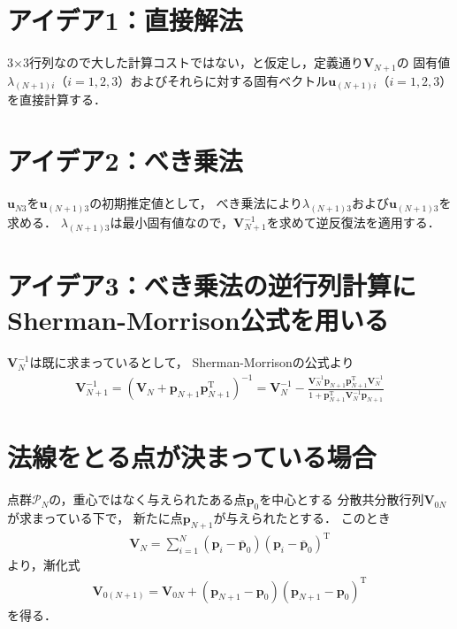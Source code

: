 ﻿\documentclass[a4paper]{jsarticle}
\begin{document}
\section{アイデア1：直接解法}

3×3行列なので大した計算コストではない，と仮定し，定義通り$\bm{V}_{N+1}$の
固有値$\lambda_{(N+1)i}$（$i=1,2,3$）およびそれらに対する固有ベクトル$\bm{u}_{(N+1)i}$（$i=1,2,3$）を直接計算する．


\section{アイデア2：べき乗法}

$\bm{u}_{N3}$を$\bm{u}_{(N+1)3}$の初期推定値として，
べき乗法により$\lambda_{(N+1)3}$および$\bm{u}_{(N+1)3}$を求める．
$\lambda_{(N+1)3}$は最小固有値なので，$\bm{V}_{N+1}^{-1}$を求めて逆反復法を適用する．

\section{アイデア3：べき乗法の逆行列計算にSherman-Morrison公式を用いる}

$\bm{V}_{N}^{-1}$は既に求まっているとして，
Sherman-Morrisonの公式より
\begin{align*}
\bm{V}_{N+1}^{-1}
=(\bm{V}_{N}+\bm{p}_{N+1}\bm{p}_{N+1}^{\mathrm{T}})^{-1}
=\bm{V}_{N}^{-1}-\frac{\bm{V}_{N}^{-1}\bm{p}_{N+1}\bm{p}_{N+1}^{\mathrm{T}}\bm{V}_{N}^{-1}}{1+\bm{p}_{N+1}^{\mathrm{T}}\bm{V}_{N}^{-1}\bm{p}_{N+1}}
\end{align*}



\section{法線をとる点が決まっている場合}

点群$\mathcal{P}_{N}$の，重心ではなく与えられたある点$\bm{p}_{0}$を中心とする
分散共分散行列$\bm{V}_{0N}$が求まっている下で，
新たに点$\bm{p}_{N+1}$が与えられたとする．
このとき
\begin{align*}
\boldsymbol{V}_{N}=\sum_{i=1}^{N}(\boldsymbol{p}_{i}-\bar{\boldsymbol{p}}_{0})(\boldsymbol{p}_{i}-\bar{\boldsymbol{p}}_{0})^{\mathrm{T}}
\end{align*}
より，漸化式
\begin{align*}
\bm{V}_{0(N+1)}=\bm{V}_{0N}+(\boldsymbol{p}_{N+1}-\bm{p}_{0})(\boldsymbol{p}_{N+1}-\bm{p}_{0})^{\mathrm{T}}
\end{align*}
を得る．
\end{document}
